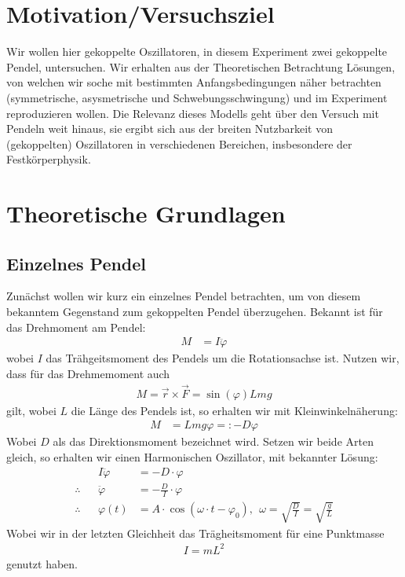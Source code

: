 
\author{Leonard Scheuer}
%


	\section{Motivation/Versuchsziel}
	Wir wollen hier gekoppelte Oszillatoren, in diesem Experiment zwei gekoppelte Pendel, untersuchen. Wir erhalten aus der Theoretischen Betrachtung Lösungen, von welchen wir soche mit bestimmten Anfangsbedingungen näher betrachten (symmetrische, asysmetrische und Schwebungsschwingung) und im Experiment reproduzieren wollen. Die Relevanz dieses Modells geht über den Versuch mit Pendeln weit hinaus, sie ergibt sich aus der breiten Nutzbarkeit von (gekoppelten) Oszillatoren in verschiedenen Bereichen, insbesondere der Festkörperphysik. 
	
	
	\section{Theoretische Grundlagen}
	\subsection{Einzelnes Pendel}
	Zunächst wollen wir kurz ein einzelnes Pendel betrachten, um von diesem bekanntem Gegenstand zum gekoppelten Pendel überzugehen. Bekannt ist für das Drehmoment am Pendel:
	\begin{align}
	M &= I\ddot{\varphi}
\end{align}
wobei $I$ das Trähgeitsmoment des Pendels um die Rotationsachse ist. Nutzen wir, dass für das Drehmemoment auch 
\begin{align}
M= \vec{r} \times \vec{F} = \sin(\varphi)Lmg 
\end{align}
gilt, wobei $L$ die Länge des Pendels ist, so erhalten wir mit Kleinwinkelnäherung:
\begin{align}
	M &=  Lmg \varphi =: -D \varphi
\end{align}
Wobei $D$ als das Direktionsmoment bezeichnet wird. Setzen wir beide Arten gleich, so erhalten wir einen Harmonischen Oszillator, mit bekannter Lösung:
\begin{align}
	&& I\ddot{\varphi} &=  -D\cdot \varphi\\
	 \therefore && \ddot{\varphi} &=  -\frac{D}{I}\cdot \varphi\\
	 \label{eq:om2} \therefore && \varphi(t) &= A \cdot  \cos(\omega\cdot t-\varphi_0),\:\:\omega = \sqrt{\frac{D}{I}} = \sqrt{\frac{g}{L}}
\end{align}
Wobei wir in der letzten Gleichheit das Trägheitsmoment für eine Punktmasse 
\begin{align}
I=mL^2
\end{align}
genutzt haben. 


